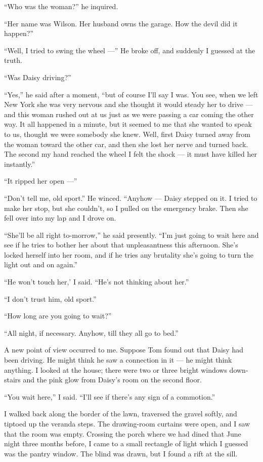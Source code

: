\documentclass{znotebook}
\begin{document}
``Who was the woman?'' he inquired.

``Her name was Wilson. Her husband owns the garage. How the devil did it happen?''

``Well, I tried to swing the wheel ---'' He broke off, and suddenly I guessed at the truth.

``Was Daisy driving?''

``Yes,'' he said after a moment, ``but of course I'll say I was. You see, when we left New York she was very nervous and she thought it would steady her to drive ---{} and this woman rushed out at us just as we were passing a car coming the other way. It all happened in a minute, but it seemed to me that she wanted to speak to us, thought we were somebody she knew. Well, first Daisy turned away from the woman toward the other car, and then she lost her nerve and turned back. The second my hand reached the wheel I felt the shock ---{} it must have killed her instantly.''

``It ripped her open ---''

``Don't tell me, old sport.'' He winced. ``Anyhow ---{} Daisy stepped on it. I tried to make her stop, but she couldn't, so I pulled on the emergency brake. Then she fell over into my lap and I drove on.

``She'll be all right to-morrow,'' he said presently. ``I'm just going to wait here and see if he tries to bother her about that unpleasantness this afternoon. She's locked herself into her room, and if he tries any brutality she's going to turn the light out and on again.''

``He won't touch her,' I said. ``He's not thinking about her.''

``I don't trust him, old sport.''

``How long are you going to wait?''

``All night, if necessary. Anyhow, till they all go to bed.''

A new point of view occurred to me. Suppose Tom found out that Daisy had been driving. He might think he saw a connection in it ---{} he might think anything. I looked at the house; there were two or three bright windows down-stairs and the pink glow from Daisy's room on the second floor.

``You wait here,'' I said. ``I'll see if there's any sign of a commotion.''

I walked back along the border of the lawn, traversed the gravel softly, and tiptoed up the veranda steps. The drawing-room curtains were open, and I saw that the room was empty. Crossing the porch where we had dined that June night three months before, I came to a small rectangle of light which I guessed was the pantry window. The blind was drawn, but I found a rift at the sill.
\end{document}
